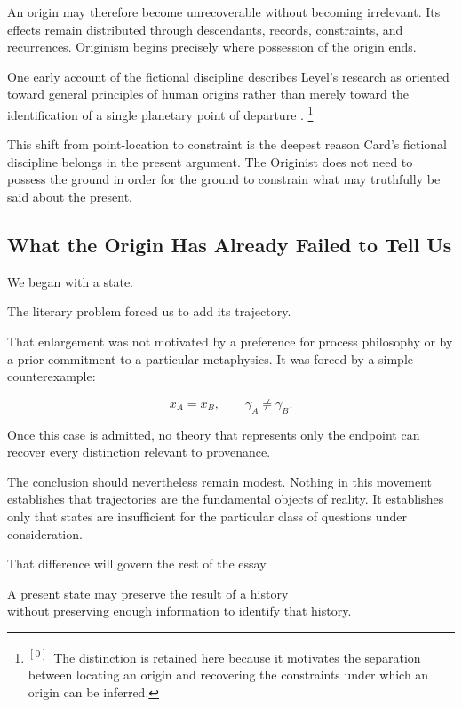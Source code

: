 \documentclass[
  11pt,
  a4paper,
  DIV=12,
  BCOR=0mm,
  parskip=half-
]{scrartcl}
\theoremstyle{definition}
\theoremstyle{plain}
\theoremstyle{remark}
\newcommand{\pfootnote}[2][?]{%
  \footnote{%
    \textsuperscript{$[#1]$}\,
    #2%
  }%
}
\begin{document}
An origin may therefore become unrecoverable without becoming irrelevant.
Its effects remain distributed through descendants, records, constraints, and
recurrences. Originism begins precisely where possession of the origin ends.

One early account of the fictional discipline describes Leyel's research as
oriented toward general principles of human origins rather than merely toward
the identification of a single planetary point of departure
\cite{card1989}.\pfootnote[0]{The distinction is retained here because
it motivates the separation between locating an origin and recovering the
constraints under which an origin can be inferred.}

This shift from point-location to constraint is the deepest reason Card's
fictional discipline belongs in the present argument. The Originist does not
need to possess the ground in order for the ground to constrain what may
truthfully be said about the present.


\subsection{What the Origin Has Already Failed to Tell Us}
\label{sec:origin-forced}

We began with a state.

The literary problem forced us to add its trajectory.

That enlargement was not motivated by a preference for process philosophy or
by a prior commitment to a particular metaphysics. It was forced by a simple
counterexample:

\[
  x_A=x_B,
  \qquad
  \gamma_A\neq\gamma_B.
\]

Once this case is admitted, no theory that represents only the endpoint can
recover every distinction relevant to provenance.

The conclusion should nevertheless remain modest. Nothing in this movement
establishes that trajectories are the fundamental objects of reality. It
establishes only that states are insufficient for the particular class of
questions under consideration.

That difference will govern the rest of the essay.

\begin{held}
\centering
A present state may preserve the result of a history\\
without preserving enough information to identify that history.
\end{held}
\end{document}
